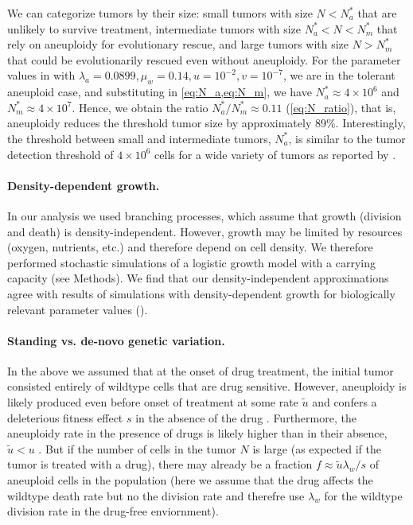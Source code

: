 \documentclass[12pt]{extarticle}
\begin{document}
We can categorize tumors by their size: small tumors with size $N<N_a^*$ that are unlikely to survive treatment, intermediate tumors with size $N_a^* < N < N_m^*$ that rely on aneuploidy for evolutionary rescue, and large tumors with size $N > N_m^*$ that could be evolutionarily rescued even without aneuploidy.
For the parameter values in  with $\lambda_a=0.0899,\mu_w=0.14, u=10^{-2}, v=10^{-7}$, we are in the tolerant aneuploid case, and substituting in \cref{eq:N_a,eq:N_m}, we have $N_a^* \approx 4 \times 10^6$ and $N_m^* \approx 4 \times 10^7$.
Hence, we obtain the ratio $N^*_a/N^*_m \approx 0.11$ (\cref{eq:N_ratio}), that is, aneuploidy reduces the threshold tumor size by approximately 89\%.
Interestingly, the threshold between small and intermediate tumors, $N_a^*$, is similar to the tumor detection threshold of $4 \times 10^6$ cells for a wide variety of tumors as reported by \citet{avanzini2019cancer}.

\paragraph*{Density-dependent growth.}

In our analysis we used branching processes, which assume that growth (division and death) is density-independent. However, growth may be limited by resources (oxygen, nutrients, etc.) and therefore depend on cell density. 
We therefore performed stochastic simulations of a logistic growth model with a carrying capacity (see Methods). 
We find that our density-independent approximations agree with results of simulations with density-dependent growth for biologically relevant parameter values ().

\paragraph*{Standing vs. de-novo genetic variation.}

In the above we assumed that at the onset of drug treatment, the initial tumor consisted entirely of wildtype cells that are drug sensitive.
However, aneuploidy is likely produced even before onset of treatment at some rate $\tilde{u}$ and confers a deleterious fitness effect $s$ in the absence of the drug \citep{replogle2020aneuploidy,giam2015aneuploidy}. Furthermore, the aneuploidy rate in the presence of drugs is likely higher than in their absence, $\tilde{u} < u$ \citep{wang2019molecular,mason2017functional}.
But if the number of cells in the tumor $N$ is large (as expected if the tumor is treated with a drug), there may already be a fraction $f \approx \tilde{u}\lambda_w/s$ of aneuploid cells in the population (here we assume that the drug affects the wildtype death rate but no the division rate and therefre use $\lambda_w$ for the wildtype division rate in the drug-free enviornment).
\end{document}
